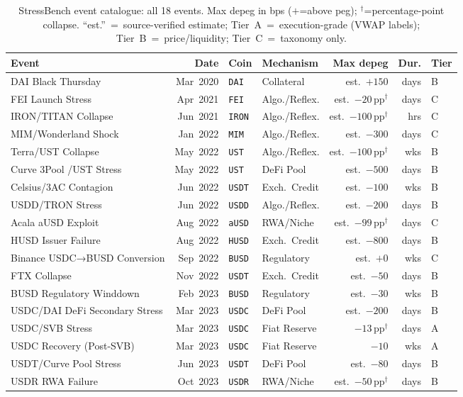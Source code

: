 \begin{table}[t]
\centering
\caption{StressBench event catalogue: all 18 events.
  Max depeg in bps ($+$=above peg); $^\dagger$=percentage-point collapse.
  ``est.''~=~source-verified estimate; Tier~A~=~execution-grade
  (VWAP labels); Tier~B~=~price/liquidity; Tier~C~=~taxonomy only.}
\label{tab:catalogue}
\setlength{\tabcolsep}{2pt}
{\scriptsize
\begin{tabular}{p{2.4cm}rp{0.9cm}p{1.35cm}rrl}
\toprule
\textbf{Event} & \textbf{Date} & \textbf{Coin} &
\textbf{Mechanism} & \textbf{Max depeg} & \textbf{Dur.} & \textbf{Tier}\\
\midrule
  DAI Black Thursday & Mar~2020 & \texttt{DAI} & Collateral & est.\ $+150$ & days & B\\
  FEI Launch Stress & Apr~2021 & \texttt{FEI} & Algo./Reflex. & est.\ $-20$\,pp$^\dagger$ & days & C\\
  IRON/\allowbreak TITAN Collapse & Jun~2021 & \texttt{IRON} & Algo./Reflex. & est.\ $-100$\,pp$^\dagger$ & hrs & C\\
  MIM/\allowbreak Wonderland Shock & Jan~2022 & \texttt{MIM} & Algo./Reflex. & est.\ $-300$ & days & C\\
  Terra/\allowbreak UST Collapse & May~2022 & \texttt{UST} & Algo./Reflex. & est.\ $-100$\,pp$^\dagger$ & wks & B\\
  Curve 3Pool /\allowbreak  UST Stress & May~2022 & \texttt{UST} & DeFi Pool & est.\ $-500$ & days & B\\
  Celsius/\allowbreak 3AC Contagion & Jun~2022 & \texttt{USDT} & Exch.\ Credit & est.\ $-100$ & wks & B\\
  USDD/\allowbreak TRON Stress & Jun~2022 & \texttt{USDD} & Algo./Reflex. & est.\ $-200$ & days & B\\
  Acala aUSD Exploit & Aug~2022 & \texttt{aUSD} & RWA/Niche & est.\ $-99$\,pp$^\dagger$ & days & C\\
  HUSD Issuer Failure & Aug~2022 & \texttt{HUSD} & Exch.\ Credit & est.\ $-800$ & days & B\\
  Binance USDC→BUSD Conversion & Sep~2022 & \texttt{BUSD} & Regulatory & est.\ $+0$ & wks & C\\
  FTX Collapse & Nov~2022 & \texttt{USDT} & Exch.\ Credit & est.\ $-50$ & days & B\\
  BUSD Regulatory Winddown & Feb~2023 & \texttt{BUSD} & Regulatory & est.\ $-30$ & wks & B\\
  USDC/\allowbreak DAI DeFi Secondary Stress & Mar~2023 & \texttt{USDC} & DeFi Pool & est.\ $-200$ & days & B\\
  USDC/\allowbreak SVB Stress & Mar~2023 & \texttt{USDC} & Fiat Reserve & $-13$\,pp$^\dagger$ & days & A\\
  USDC Recovery (Post-SVB) & Mar~2023 & \texttt{USDC} & Fiat Reserve & $-10$ & wks & A\\
  USDT/\allowbreak Curve Pool Stress & Jun~2023 & \texttt{USDT} & DeFi Pool & est.\ $-80$ & days & B\\
  USDR RWA Failure & Oct~2023 & \texttt{USDR} & RWA/Niche & est.\ $-50$\,pp$^\dagger$ & days & B\\
\bottomrule
\end{tabular}
}
\end{table}